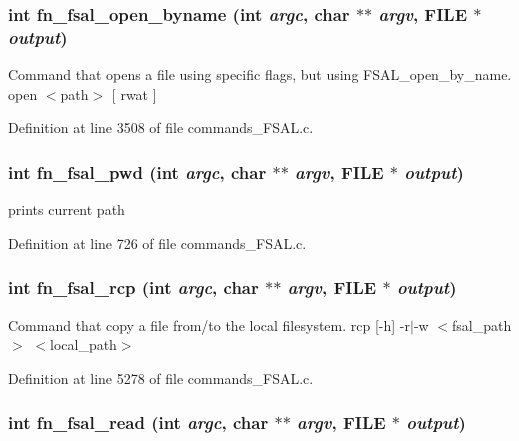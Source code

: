 \subsubsection[{fn\_\-fsal\_\-open\_\-byname}]{\setlength{\rightskip}{0pt plus 5cm}int fn\_\-fsal\_\-open\_\-byname (int {\em argc}, \/  char $\ast$$\ast$ {\em argv}, \/  FILE $\ast$ {\em output})}\label{commands__FSAL_8c_a74f1d4efec11e55723d0ac4eaf7856e}


Command that opens a file using specific flags, but using FSAL\_\-open\_\-by\_\-name. open $<$path$>$ [ rwat ] 

Definition at line 3508 of file commands\_\-FSAL.c.
\subsubsection[{fn\_\-fsal\_\-pwd}]{\setlength{\rightskip}{0pt plus 5cm}int fn\_\-fsal\_\-pwd (int {\em argc}, \/  char $\ast$$\ast$ {\em argv}, \/  FILE $\ast$ {\em output})}\label{commands__FSAL_8c_5889873765cfb1062f3fab4ffd7a38cb}


prints current path 

Definition at line 726 of file commands\_\-FSAL.c.
\subsubsection[{fn\_\-fsal\_\-rcp}]{\setlength{\rightskip}{0pt plus 5cm}int fn\_\-fsal\_\-rcp (int {\em argc}, \/  char $\ast$$\ast$ {\em argv}, \/  FILE $\ast$ {\em output})}\label{commands__FSAL_8c_187b923de1fe342ff5e352bbb41acbbe}


Command that copy a file from/to the local filesystem. rcp [-h] -r$|$-w $<$fsal\_\-path$>$ $<$local\_\-path$>$ 

Definition at line 5278 of file commands\_\-FSAL.c.
\subsubsection[{fn\_\-fsal\_\-read}]{\setlength{\rightskip}{0pt plus 5cm}int fn\_\-fsal\_\-read (int {\em argc}, \/  char $\ast$$\ast$ {\em argv}, \/  FILE $\ast$ {\em output})}\label{commands__FSAL_8c_35036b2c35ca5d8d4c69fe777b3bf61a}


